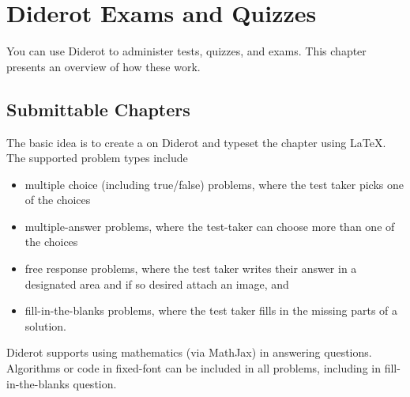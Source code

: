 \chapter{Diderot Exams and Quizzes}
\label{ch:quiz}

\begin{cluster}
\label{grp:prmbl:quiz::diderot}

\begin{preamble}
\label{prmbl:quiz::diderot}
You can use Diderot to administer tests, quizzes, and exams.  This
chapter presents an overview of how these work.

\end{preamble}
\end{cluster}


\section{Submittable Chapters}
\label{ch:quiz::submittable-chapters}

\begin{cluster}
\label{grp:grm:quiz::basic}

\begin{gram}
\label{grm:quiz::basic}
The basic idea is to create a  on Diderot and typeset the chapter using LaTeX.  The supported problem types include
\begin{itemize}
\item multiple choice (including true/false) problems, where the test taker picks one of the
  choices
\item multiple-answer problems, where the test-taker can choose more than one of the choices
\item free response problems, where the test taker writes their answer in a designated area and if so desired attach an image, and
\item fill-in-the-blanks problems, where the test taker fills in the missing parts of a solution.
\end{itemize}

\end{gram}
\end{cluster}

\begin{cluster}
\label{grp:grm:quiz::diderot}

\begin{gram}
\label{grm:quiz::diderot}
Diderot supports using mathematics (via MathJax) in answering questions.  
Algorithms or code in fixed-font can be included in all problems, including in fill-in-the-blanks question.

\end{gram}
\end{cluster}


